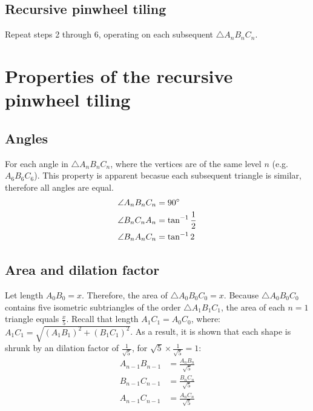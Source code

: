 

\subsection{Recursive pinwheel tiling}
Repeat steps 2 through 6, operating on each subsequent $\triangle A_{n}B_{n}C_{n}$.


\newpage



\section{Properties of the recursive pinwheel tiling}
\subsection{Angles}
For each angle in $\triangle A_{n}B_{n}C_{n}$, where the vertices are of the same level $n$ (e.g. \angle $A_{6}B_{6}C_{6}$). This property is apparent becasue each subsequent triangle is similar, therefore all angles are equal.
\begin{equation}
    \begin{aligned}
        \angle A_{n}B_{n}C_{n} &= 90\degree \\
        \angle B_{n}C_{n}A_{n} &= \tan^{-1}\frac{1}{2} \\
        \angle B_{n}A_{n}C_{n} &= \tan^{-1}2
    \end{aligned}
\end{equation}

\subsection{Area and dilation factor}
Let length $A_{0}B_{0} = x$. Therefore, the area of $\triangle A_{0}B_{0}C_{0} = x$. Because $\triangle A_{0}B_{0}C_{0}$ contains five isometric subtriangles of the order $\triangle A_{1}B_{1}C_{1}$, the area of each $n = 1$ triangle equals $\frac{x}{5}$. Recall that length $A_{1}C_{1} = A_{0}C_{0}$, where: $A_{1}C_{1} = \sqrt{(A_{1}B_{1})^2 + (B_{1}C_{1})^2}$. As a result, it is shown that each shape is shrunk by an dilation factor of $\frac{1}{\sqrt{5}}$, for $\sqrt{5} \times \frac{1}{\sqrt{5}} = 1$:
\begin{equation}
    \begin{aligned}
        A_{n-1}B_{n-1} &= \frac{A_{n}B_{n}}{\sqrt{5}} \\
        B_{n-1}C_{n-1} &= \frac{B_{n}C_{n}}{\sqrt{5}} \\
        A_{n-1}C_{n-1} &= \frac{A_{n}C_{n}}{\sqrt{5}}
    \end{aligned}
\end{equation}

